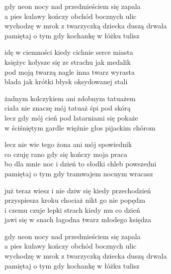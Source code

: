 \begin{text}
    gdy neon nocy nad przedmieściem się zapala\\
    a pies kulawy kończy obchód bocznych ulic\\
    wychodzę w mrok z twarzyczką dziecka duszą drwala\\
    pamiętaj o tym gdy kochankę w łóżku tulisz

    idę w ciemności kiedy cichnie serce miasta\\
    księżyc kołysze się ze strachu jak medalik\\
    pod moją twarzą nagle inna twarz wyrasta\\
    blada jak krótki błysk oksydowanej stali

    żadnym kolczykiem ani zdobnym tatuażem\\
    ciała nie znaczę mój tatuaż śpi pod skórą\\
    lecz gdy mój cień pod latarniami się pokaże\\
    w ściśniętym gardle więźnie głos pijackim chórom

    lecz nie wie tego żona ani mój spowiednik\\
    co czuję rano gdy się kończy moja praca\\
    bo dla mnie noc i dzień to słodki chleb powszedni\\
    pamiętaj o tym gdy tramwajem nocnym wracasz

    już teraz wiesz i nie dziw się kiedy przechodzień\\
    przyspiesza kroku chociaż nikt go nie popędza\\
    i czemu czuje lepki strach kiedy mu co dzień\\
    jawi się w snach łagodna twarz młodego księdza

    gdy neon nocy nad przedmieściem się zapala\\
    a pies kulawy kończy obchód bocznych ulic\\
    wychodzę w mrok z twarzyczką dziecka duszą drwala\\
    pamiętaj o tym gdy kochankę w łóżku tulisz
\end{text}
\begin{chord}

\end{chord}